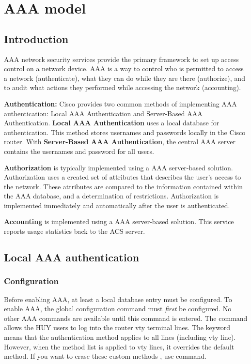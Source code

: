 \chapter{AAA model}

\section{Introduction}

AAA network security services provide the primary framework to set up access control on a network device. AAA is a way to control who is permitted to access a network (authenticate), what they can do while they are there (authorize), and to audit what actions they performed while accessing the network (accounting).

\textbf{Authentication:} Cisco provides two common methods of implementing AAA authentication: Local AAA Authentication and Server-Based AAA Authentication. \textbf{Local AAA Authentication} uses a local database for authentication. This method stores usernames and passwords locally in the Cisco router. With \textbf{Server-Based AAA Authentication}, the central AAA server contains the usernames and password for all users.

\textbf{Authorization} is typically implemented using a AAA server-based solution. Authorization uses a created set of attributes that describes the user’s access to the network. These attributes are compared to the information contained within the AAA database, and a determination of restrictions. Authorization is implemented immediately and automatically after the user is authenticated.

\textbf{Accounting} is implemented using a AAA server-based solution. This service reports usage statistics back to the ACS server. 

\section{Local AAA authentication}

\subsection{Configuration}

Before enabling AAA, at least a local database entry must be configured. To enable AAA, the  global configuration command must \emph{first} be configured. No other AAA commands are available until this command is entered. The  command allows the HUY users to log into the router vty terminal lines. The  keyword means that the authentication method applies to all lines (including vty line). However, when the method list  is applied to vty lines, it overrides the default method.  If you want to erase these custom methods , use  command.

